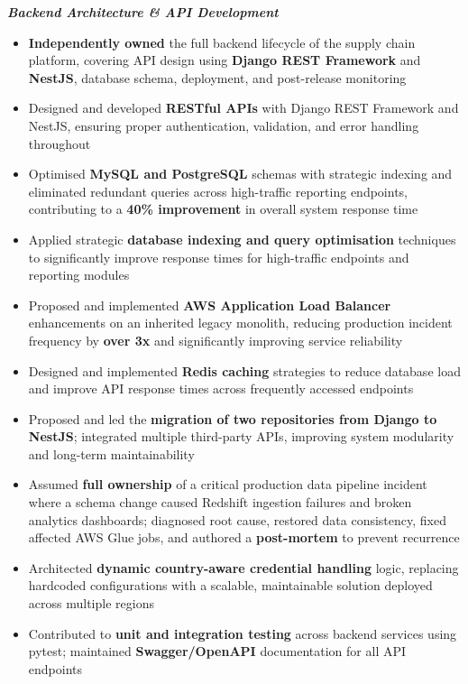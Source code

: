 \documentclass[a4paper,11.5pt]{article}
\newcommand{\h}[1]{\textbf{\textcolor{hgray}{#1}}}
\begin{document}
\vspace{0.25em}
\textit{\textbf{\textcolor{titlenavy}{\small Backend Architecture \& API Development}}}
\begin{itemize}
  \item \h{Independently owned} the full backend lifecycle of the supply chain platform, covering API design using \h{Django REST Framework} and \h{NestJS}, database schema, deployment, and post-release monitoring
  \item Designed and developed \h{RESTful APIs} with Django REST Framework and NestJS, ensuring proper authentication, validation, and error handling throughout
  \item Optimised \h{MySQL and PostgreSQL} schemas with strategic indexing and eliminated redundant queries across high-traffic reporting endpoints, contributing to a \h{40\% improvement} in overall system response time
  \item Applied strategic \h{database indexing and query optimisation} techniques to significantly improve response times for high-traffic endpoints and reporting modules
  \item Proposed and implemented \h{AWS Application Load Balancer} enhancements on an inherited legacy monolith, reducing production incident frequency by \h{over 3x} and significantly improving service reliability
  \item Designed and implemented \h{Redis caching} strategies to reduce database load and improve API response times across frequently accessed endpoints
  \item Proposed and led the \h{migration of two repositories from Django to NestJS}; integrated multiple third-party APIs, improving system modularity and long-term maintainability
  \item Assumed \h{full ownership} of a critical production data pipeline incident where a schema change caused Redshift ingestion failures and broken analytics dashboards; diagnosed root cause, restored data consistency, fixed affected AWS Glue jobs, and authored a \h{post-mortem} to prevent recurrence
  \item Architected \h{dynamic country-aware credential handling} logic, replacing hardcoded configurations with a scalable, maintainable solution deployed across multiple regions
  \item Contributed to \h{unit and integration testing} across backend services using pytest; maintained \h{Swagger/OpenAPI} documentation for all API endpoints
\end{itemize}
\end{document}
